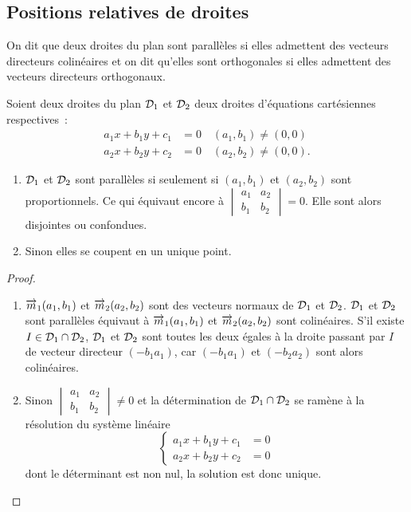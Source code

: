 \subsection{Positions relatives de droites}
 On dit que deux droites du plan sont parallèles si elles admettent des vecteurs directeurs colinéaires et on dit qu'elles sont orthogonales si elles admettent des vecteurs directeurs orthogonaux.

 \begin{prop}
Soient deux droites du plan $\mathcal{D}_1$ et $\mathcal{D}_2$ deux droites d'équations cartésiennes respectives~:
\begin{align}
  a_1x+b_1y+c_1&=0 \quad (a_1,b_1)\neq(0,0)\\
  a_2x+b_2y+c_2&=0 \quad (a_2,b_2)\neq(0,0).
\end{align}
\begin{enumerate}
\item $\mathcal{D}_1$ et $\mathcal{D}_2$ sont parallèles si seulement si $(a_1,b_1)$ et $(a_2,b_2)$ sont proportionnels. Ce qui équivaut encore à $
  \begin{vmatrix}
    a_1 & a_2 \\
    b_1 & b_2
  \end{vmatrix}=0$.
Elle sont alors disjointes ou confondues.
\item Sinon elles se coupent en un unique point.
\end{enumerate}
 \end{prop}
 \begin{proof}
   \begin{enumerate}
   \item $\overrightarrow{m}_1(a_1,b_1)$ et $\overrightarrow{m}_2(a_2,b_2)$ sont des vecteurs normaux de $\mathcal{D}_1$ et $\mathcal{D}_2$. $\mathcal{D}_1$ et $\mathcal{D}_2$ sont parallèles équivaut à $\overrightarrow{m}_1(a_1,b_1)$ et $\overrightarrow{m}_2(a_2,b_2)$ sont colinéaires. S'il existe $I \in \mathcal{D}_1 \cap \mathcal{D}_2$, $\mathcal{D}_1$ et $\mathcal{D}_2$ sont toutes les deux égales à la droite passant par $I$ de vecteur directeur $(-b_1 a_1)$, car $(-b_1 a_1)$ et $(-b_2 a_2)$ sont alors colinéaires.
     \item Sinon $
  \begin{vmatrix}
    a_1 & a_2 \\
    b_1 & b_2
  \end{vmatrix} \neq 0$ et la détermination de $\mathcal{D}_1 \cap \mathcal{D}_2$ se ramène à la résolution du système linéaire
\begin{equation}
 \begin{cases} 
   a_1x+b_1y+c_1 &=0 \\ 
   a_2x+b_2y+c_2 &=0
 \end{cases}
\end{equation}
dont le déterminant est non nul, la solution est donc unique.
   \end{enumerate}
\end{proof}
